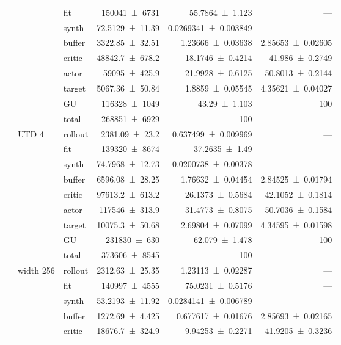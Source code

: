{\begin{longtable}{@{}lllrrr@{}}
     &  & fit & \num{150041+-6731} & \num{55.7864+-1.123} & --- \\
     &  & synth & \num{72.5129+-11.39} & \num{0.0269341+-0.003849} & --- \\
     &  & buffer & \num{3322.85+-32.51} & \num{1.23666+-0.03638} & \num{2.85653+-0.02605} \\
     &  & critic & \num{48842.7+-678.2} & \num{18.1746+-0.4214} & \num{41.986+-0.2749} \\
     &  & actor & \num{59095+-425.9} & \num{21.9928+-0.6125} & \num{50.8013+-0.2144} \\
     &  & target & \num{5067.36+-50.84} & \num{1.8859+-0.05545} & \num{4.35621+-0.04027} \\
     &  & GU & \num{116328+-1049} & \num{43.29+-1.103} & 100 \\
     &  & total & \num{268851+-6929} & \num{100} & --- \\
    \addlinespace[2pt]
     & UTD 4 & rollout & \num{2381.09+-23.2} & \num{0.637499+-0.009969} & --- \\
     &  & fit & \num{139320+-8674} & \num{37.2635+-1.49} & --- \\
     &  & synth & \num{74.7968+-12.73} & \num{0.0200738+-0.00378} & --- \\
     &  & buffer & \num{6596.08+-28.25} & \num{1.76632+-0.04454} & \num{2.84525+-0.01794} \\
     &  & critic & \num{97613.2+-613.2} & \num{26.1373+-0.5684} & \num{42.1052+-0.1814} \\
     &  & actor & \num{117546+-313.9} & \num{31.4773+-0.8075} & \num{50.7036+-0.1584} \\
     &  & target & \num{10075.3+-50.68} & \num{2.69804+-0.07099} & \num{4.34595+-0.01598} \\
     &  & GU & \num{231830+-630} & \num{62.079+-1.478} & 100 \\
     &  & total & \num{373606+-8545} & \num{100} & --- \\
    \addlinespace[2pt]
     & width 256 & rollout & \num{2312.63+-25.35} & \num{1.23113+-0.02287} & --- \\
     &  & fit & \num{140997+-4555} & \num{75.0231+-0.5176} & --- \\
     &  & synth & \num{53.2193+-11.92} & \num{0.0284141+-0.006789} & --- \\
     &  & buffer & \num{1272.69+-4.425} & \num{0.677617+-0.01676} & \num{2.85693+-0.02165} \\
     &  & critic & \num{18676.7+-324.9} & \num{9.94253+-0.2271} & \num{41.9205+-0.3236} \\

\end{longtable}}
